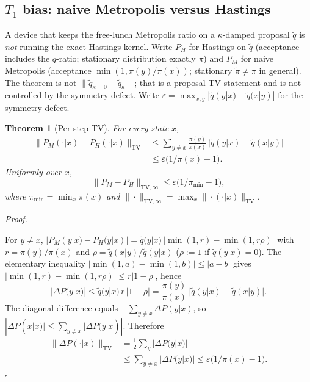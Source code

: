 \documentclass[aps,prx,reprint,floatfix,amsmath,amssymb,amsfonts]{revtex4-2}
\newtheorem{theorem}{Theorem}
\newenvironment{proof}[1][Proof]{%
  \par\medskip\noindent\textit{#1.}\ignorespaces
}{%
  \unskip\nobreak\hfill$\square$\par\medskip
}
\begin{document}
\subsection{$T_1$ bias: naive Metropolis versus Hastings}

A device that keeps the free-lunch Metropolis ratio on a $\kappa$-damped
proposal $\tilde q$ is \emph{not} running the exact Hastings kernel.
Write $P_H$ for Hastings on $\tilde q$ (acceptance includes the
$q$-ratio; stationary distribution exactly $\pi$) and $P_M$ for naive
Metropolis (acceptance $\min(1,\pi(y)/\pi(x))$; stationary
$\tilde\pi \neq \pi$ in general). The theorem is not
$\|\tilde q_{\kappa=0} - \tilde q_\kappa\|$; that is a proposal-TV
statement and is not controlled by the symmetry defect. Write
$\varepsilon = \max_{x,y} |\tilde q(y|x) - \tilde q(x|y)|$ for the
symmetry defect.

\begin{theorem}[Per-step TV]
\label{thm:perstep}
For every state $x$,
\begin{align}
  \bigl\| P_M(\cdot|x) - P_H(\cdot|x) \bigr\|_{\mathrm{TV}}
  &\le
  \sum_{y\neq x} \frac{\pi(y)}{\pi(x)}\, \bigl|\tilde q(y|x) - \tilde q(x|y)\bigr|
  \nonumber\\
  &\le
  \varepsilon \bigl(1/\pi(x) - 1\bigr).
\end{align}
Uniformly over $x$,
\begin{equation}
  \|P_M - P_H\|_{\mathrm{TV},\infty}
  \le
  \varepsilon \bigl(1/\pi_{\min} - 1\bigr),
\end{equation}
where $\pi_{\min} = \min_x \pi(x)$ and
$\|\cdot\|_{\mathrm{TV},\infty} = \max_x \|\cdot(\cdot|x)\|_{\mathrm{TV}}$.
\end{theorem}

\begin{proof}
For $y\neq x$,
$|P_M(y|x)-P_H(y|x)| = \tilde q(y|x)\, |\min(1,r)-\min(1,r\rho)|$ with
$r=\pi(y)/\pi(x)$ and $\rho = \tilde q(x|y)/\tilde q(y|x)$
($\rho:=1$ if $\tilde q(y|x)=0$). The elementary inequality
$|\min(1,a)-\min(1,b)|\le |a-b|$ gives
$|\min(1,r)-\min(1,r\rho)| \le r|1-\rho|$, hence
\begin{equation}
  |\Delta P(y|x)|
  \le
  \tilde q(y|x)\, r\, |1-\rho|
  =
  \frac{\pi(y)}{\pi(x)}\, \bigl|\tilde q(y|x)-\tilde q(x|y)\bigr|.
\end{equation}
The diagonal difference equals $-\sum_{y\neq x}\Delta P(y|x)$, so
$|\Delta P(x|x)| \le \sum_{y\neq x}|\Delta P(y|x)|$. Therefore
\begin{align}
  \|\Delta P(\cdot|x)\|_{\mathrm{TV}}
  &=
  \tfrac12 \sum_y |\Delta P(y|x)|
  \nonumber\\
  &\le
  \sum_{y\neq x} |\Delta P(y|x)|
  \le
  \varepsilon\bigl(1/\pi(x)-1\bigr).
\end{align}
\end{proof}
\end{document}
